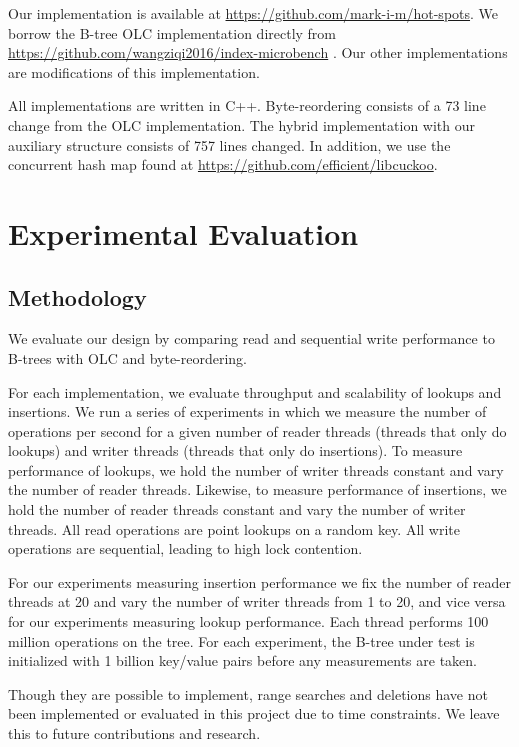 \documentclass[twocolumn]{article}
\begin{document}
Our implementation is available at \url{https://github.com/mark-i-m/hot-spots}.
We borrow the B-tree OLC implementation directly from
\url{https://github.com/wangziqi2016/index-microbench} \cite{art}. Our other
implementations are modifications of this implementation.

All implementations are written in C++. Byte-reordering consists of a 73 line
change from the OLC implementation. The hybrid implementation with our
auxiliary structure consists of 757 lines changed. In addition, we use the
concurrent hash map found at \url{https://github.com/efficient/libcuckoo}.

\section{Experimental Evaluation}

\subsection{Methodology}

We evaluate our design by comparing read and sequential write performance to
B-trees with OLC and byte-reordering.

For each implementation, we evaluate throughput and scalability of lookups and
insertions. We run a series of experiments in which we measure the number of
operations per second for a given number of reader threads (threads that only
do lookups) and writer threads (threads that only do insertions). To measure
performance of lookups, we hold the number of writer threads constant and vary
the number of reader threads. Likewise, to measure performance of insertions,
we hold the number of reader threads constant and vary the number of writer
threads. All read operations are point lookups on a random key. All write
operations are sequential, leading to high lock contention.

For our experiments measuring insertion performance we fix the number of reader
threads at 20 and vary the number of writer threads from 1 to 20, and vice
versa for our experiments measuring lookup performance. Each thread performs
100 million operations on the tree. For each experiment, the B-tree under test
is initialized with 1 billion key/value pairs before any measurements are
taken.

Though they are possible to implement, range searches and deletions have not
been implemented or evaluated in this project due to time constraints. We leave
this to future contributions and research.
\end{document}
